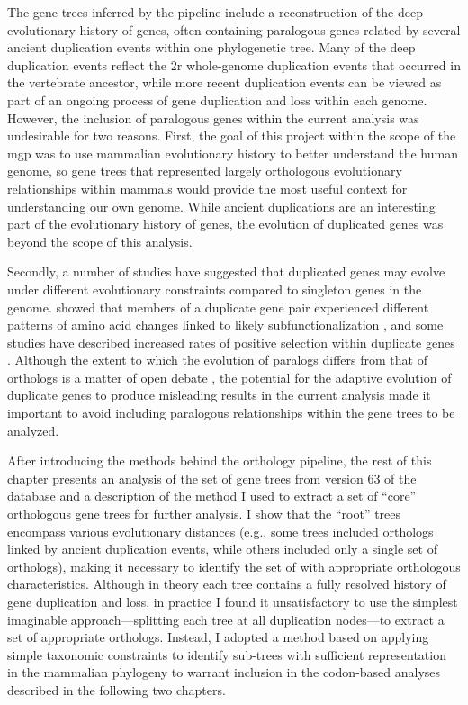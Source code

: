 The gene trees inferred by the \cmp pipeline include a reconstruction
of the deep evolutionary history of genes, often containing paralogous
genes related by several ancient duplication events within one
phylogenetic tree. Many of the deep duplication events reflect the
\ac{2r} whole-genome duplication events that occurred in the
vertebrate ancestor, while more recent duplication events can be
viewed as part of an ongoing process of gene duplication and loss
within each genome. However, the inclusion of paralogous genes within
the current analysis was undesirable for two reasons. First, the goal
of this project within the scope of the \ac{mgp} was to use mammalian
evolutionary history to better understand the human genome, so gene
trees that represented largely orthologous evolutionary relationships
within mammals would provide the most useful context for understanding
our own genome. While ancient duplications are an interesting part of
the evolutionary history of genes, the evolution of duplicated genes
was beyond the scope of this analysis.

Secondly, a number of studies have suggested that duplicated genes may
evolve under different evolutionary constraints compared to singleton
genes in the genome. \citet{Dermitzakis2001a} showed that members of a
duplicate gene pair experienced different patterns of amino acid
changes linked to likely subfunctionalization \citep{Massingham2001},
and some studies have described increased rates of positive selection
within duplicate genes
\citep{Lynch2000,Zhang2002,He2005,Hahn2009a}. Although the extent to
which the evolution of paralogs differs from that of orthologs is a
matter of open debate \citep{Nembaware2002,Jordan2004,Studer2009}, the
potential for the adaptive evolution of duplicate genes to produce
misleading results in the current analysis made it important to avoid
including paralogous relationships within the gene trees to be
analyzed.

After introducing the methods behind the \cmp orthology pipeline, the
rest of this chapter presents an analysis of the set of gene trees
from version 63 of the \ens \cmp database and a description of the
method I used to extract a set of ``core'' orthologous gene trees for
further analysis. I show that the ``root'' \cmp trees encompass
various evolutionary distances (e.g., some trees included orthologs
linked by ancient duplication events, while others included only a
single set of orthologs), making it necessary to identify the set of
\subtr with appropriate orthologous characteristics. Although in
theory each \cmp tree contains a fully resolved history of gene
duplication and loss, in practice I found it unsatisfactory to use the
simplest imaginable approach---splitting each tree at all duplication
nodes---to extract a set of appropriate orthologs. Instead, I adopted
a method based on applying simple taxonomic constraints to identify
sub-trees with sufficient representation in the mammalian phylogeny to
warrant inclusion in the codon-based analyses described in the
following two chapters.

